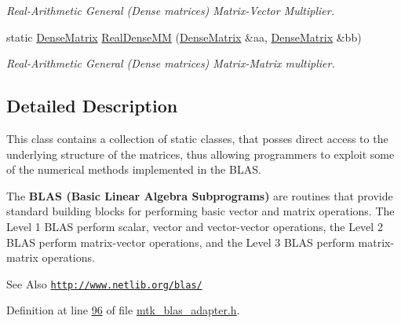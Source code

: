 \begin{DoxyCompactItemize}
\begin{DoxyCompactList}\small\item\em Real-\/\-Arithmetic General (Dense matrices) Matrix-\/\-Vector Multiplier. \end{DoxyCompactList}\item 
static \hyperlink{classmtk_1_1DenseMatrix}{Dense\-Matrix} \hyperlink{classmtk_1_1BLASAdapter_acebd0e9bfe0bdd609c7fbea98ccfd3b5}{Real\-Dense\-M\-M} (\hyperlink{classmtk_1_1DenseMatrix}{Dense\-Matrix} \&aa, \hyperlink{classmtk_1_1DenseMatrix}{Dense\-Matrix} \&bb)
\begin{DoxyCompactList}\small\item\em Real-\/\-Arithmetic General (Dense matrices) Matrix-\/\-Matrix multiplier. \end{DoxyCompactList}\end{DoxyCompactItemize}


\subsection{Detailed Description}
This class contains a collection of static classes, that posses direct access to the underlying structure of the matrices, thus allowing programmers to exploit some of the numerical methods implemented in the B\-L\-A\-S.

The {\bfseries B\-L\-A\-S (Basic Linear Algebra Subprograms)} are routines that provide standard building blocks for performing basic vector and matrix operations. The Level 1 B\-L\-A\-S perform scalar, vector and vector-\/vector operations, the Level 2 B\-L\-A\-S perform matrix-\/vector operations, and the Level 3 B\-L\-A\-S perform matrix-\/matrix operations.

\begin{DoxySeeAlso}{See Also}
\href{http://www.netlib.org/blas/}{\tt http\-://www.\-netlib.\-org/blas/} 
\end{DoxySeeAlso}


Definition at line \hyperlink{mtk__blas__adapter_8h_source_l00096}{96} of file \hyperlink{mtk__blas__adapter_8h_source}{mtk\-\_\-blas\-\_\-adapter.\-h}.



